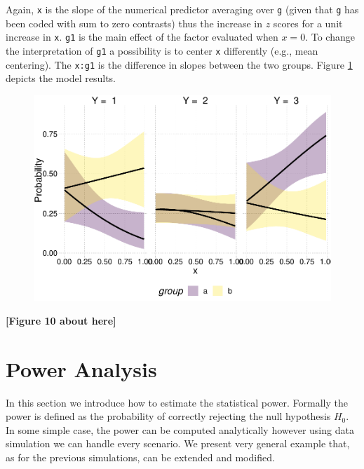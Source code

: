 \documentclass[
  man,floatsintext]{apa6}
\begin{document}
\normalsize

Again, \texttt{x} is the slope of the numerical predictor averaging over \texttt{g} (given that \texttt{g} has been coded with sum to zero contrasts) thus the increase in \(z\) scores for a unit increase in \texttt{x}. \texttt{g1} is the main effect of the factor evaluated when \(x = 0\). To change the interpretation of \texttt{g1} a possibility is to center \texttt{x} differently (e.g., mean centering). The \texttt{x:g1} is the difference in slopes between the two groups. Figure \ref{fig:fig-effects-num-by-cat-interaction} depicts the model results.

\scriptsize

\begin{figure}

{\centering \includegraphics{paper-new_files/figure-latex/fig-effects-num-by-cat-interaction-1} 

}

\caption{ }\label{fig:fig-effects-num-by-cat-interaction}
\end{figure}

\begin{center}\textbf{[Figure 10 about here]} \end{center}

\normalsize

\section{Power Analysis}\label{power-analysis}

In this section we introduce how to estimate the statistical power. Formally the power is defined as the probability of correctly rejecting the null hypothesis \(H_0\). In some simple case, the power can be computed analytically however using data simulation we can handle every scenario. We present very general example that, as for the previous simulations, can be extended and modified.
\end{document}
